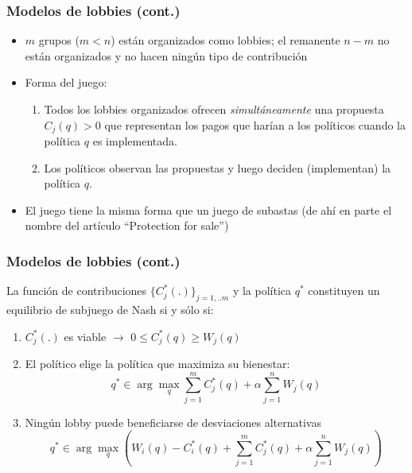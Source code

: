 \documentclass[14pt,aspectratio=169]{beamer}
\begin{document}
\begin{frame}
\frametitle{Modelos de lobbies (cont.)}
\begin{itemize}
\item $m$ grupos ($m < n$) están organizados como lobbies; el remanente $n-m$ no están organizados y no hacen ningún tipo de contribución
\item Forma del juego:
\begin{enumerate}
\item Todos los lobbies organizados ofrecen \textit{simultáneamente} una propuesta $C_j(q)>0$ que representan los pagos que harían a los políticos cuando la política $q$ es implementada. 
\item Los políticos observan las propuestas y luego deciden (implementan) la política $q$. 
\end{enumerate}
\item El juego tiene la misma forma que un juego de subastas (de ahí en parte el nombre del artículo ``Protection for sale'')
\end{itemize}
\end{frame}


\begin{frame}
\frametitle{Modelos de lobbies (cont.)}
\begin{proposition}
La función de contribuciones $\{C_j^*(.)\}_{j=1,..m}$ y la política $q^*$ constituyen un equilibrio de subjuego de Nash si y sólo si:
\begin{enumerate}
\item $C^*_j(.)$ es viable $\longrightarrow$ $0 \leq C^*_j(q) \geq W_j(q)$
\item El político elige la política que maximiza su bienestar:
\begin{equation}
q^* \in \arg\max_q \sum_{j=1}^m C_j^*(q)+\alpha \sum_{j=1}^n W_j(q)
\end{equation}
\item Ningún lobby puede beneficiarse de desviaciones alternativas
\begin{equation}
q^* \in \arg\max_q (W_i(q)-C^*_i(q)+ \sum_{j=1}^m C_j^*(q)+\alpha \sum_{j=1}^n W_j(q))
\end{equation}
\end{enumerate}
\end{proposition}
\end{frame}
\end{document}
